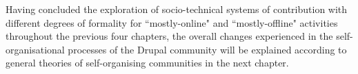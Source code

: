 Having concluded the exploration of socio-technical systems of contribution with different degrees of formality for ``mostly-online" and ``mostly-offline" activities throughout the previous four chapters, the overall changes experienced in the self-organisational processes of the Drupal community will be explained according to general theories of self-organising communities in the next chapter.